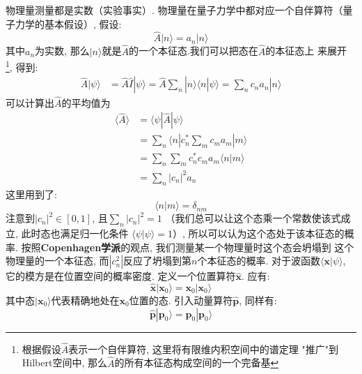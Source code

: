         物理量测量都是实数（实验事实）. 物理量在量子力学中都对应一个自伴算符（量子力学的基本假设）, 
        假设: 
        \begin{equation}
            \hat{A} |n\rangle = a_n |n\rangle
        \end{equation}
        其中$a_n$为实数, 那么$|n\rangle$就是$\hat{A}$的一个本征态.我们可以把态在$\hat{A}$的本征态上
        来展开
        \footnote{根据假设$\hat{A}$表示一个自伴算符, 这里将有限维内积空间中的谱定理
        "推广"到Hilbert空间中, 那么$\hat{A}$的所有本征态构成空间的一个完备基}, 得到: 
        \begin{equation}\begin{aligned}
            \hat{A}|\psi \rangle &= \hat{A}\hat{I}|\psi \rangle
            = \hat{A} \sum_n |n\rangle \langle n|\psi\rangle
            = \sum_n c_n a_n |n\rangle
        \end{aligned}\end{equation}
        可以计算出$\hat{A}$的平均值为
        \begin{equation}\begin{aligned}
            \langle \hat{A} \rangle &= \langle \psi |\hat{A}| \psi \rangle\\
            &= \sum_n \langle n| c_n^* \sum_m c_m a_m |m\rangle\\
            &= \sum_n \sum_m c_n^* c_m a_m \langle n|m\rangle\\
            &= \sum_n |c_n|^2 a_n
        \end{aligned}\end{equation}
        这里用到了: 
        \[\langle n | m \rangle = \delta_{nm}\]
        注意到$|c_n|^2 \in [0,1]$, 且$\sum_n |c_n|^2 = 1$
        （我们总可以让这个态乘一个常数使该式成立, 此时态也满足归一化条件
        $\langle \psi |\psi \rangle = 1$）, 所以可以认为这个态处于该本征态的概率. 
        按照\textbf{Copenhagen学派}的观点, 我们测量某一个物理量时这个态会坍塌到
        这个物理量的一个本征态, 而$|c_n^2|$反应了坍塌到第$n$个本征态的概率.
        对于波函数$\langle \bm{x}|\psi \rangle$, 它的模方是在位置空间的概率密度. 
        定义一个位置算符$\hat{\bm{x}}$. 应有: 
        \begin{equation}
            \hat{\bm{x}}|\bm{x}_0\rangle = \bm{x}_0 |\bm{x}_0\rangle
        \end{equation}
        其中态$|\bm{x}_0\rangle$代表精确地处在$\bm{x}_0$位置的态. 
        引入动量算符$\hat{\bm{p}}$, 同样有: 
        \begin{equation}
            \hat{\bm{p}}|\bm{p}_0\rangle = \bm{p}_0 |\bm{p}_0\rangle
        \end{equation}
